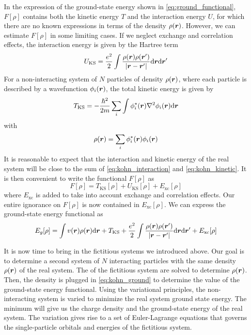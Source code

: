 In the expression of the ground-state energy shown in \cref{eq:ground_functional}, $F[\rho]$ contains both the kinetic energy $T$ and the interaction energy $U$, for which there are no known expressions in terms of the density $\rho(\mathbf{\boldsymbol{r}})$. However, we can estimate $F[\rho]$ in some limiting cases. If we neglect exchange and correlation effects, the interaction energy is given by the Hartree term
\begin{equation} \label{eq:kohn_interaction}
    U_\text{KS} = \frac{e^2}{2} \int \frac{\rho(\vec{r})\rho(\vec{r}')}{|\vec{r}-\vec{r}'|}  \dr \dr'
\end{equation}
For a non-interacting system of $N$ particles of density $\rho(\mathbf{\boldsymbol{r}})$, where each particle is described by a wavefunction $\phi_i(\mathbf{\boldsymbol{r}})$, the total kinetic energy is given by
\begin{equation} \label{eq:kohn_kinetic}
    T_\text{KS} = -\frac{\hslash^2}{2m}\sum_i \int \rr{\phi_i^*} \laplacian \rr{\phi_i} \dr
\end{equation}
with
\begin{equation}
    \rho(\mathbf{\boldsymbol{r}}) = \sum_i \phi_i^*(\mathbf{\boldsymbol{r}})\phi_i(\mathbf{\boldsymbol{r}})
\end{equation}
It is reasonable to expect that the interaction and kinetic energy of the real system will be close to the sum of \cref{eq:kohn_interaction} and \cref{eq:kohn_kinetic}. It is then convenient to write the functional $F[\rho]$ as
\begin{equation}
    F[\rho] = T_\text{KS}[\rho] + U_\text{KS}[\rho] + E_\text{xc}[\rho]
\end{equation}
where $E_\text{xc}$ is added to take into account exchange and correlation effects. Our entire ignorance on $F[\rho]$ is now contained in $E_\text{xc}[\rho]$.  We can express the ground-state energy functional as
\begin{equation} \label{eq:kohn_ground}
    E_g[\rho] = \int \rr{v} \rr{\rho} \dr +  T_\text{KS} + \frac{e^2}{2} \int \frac{\rho(\vec{r})\rho(\vec{r}')}{|\vec{r}-\vec{r}'|}  \dr \dr' + E_\text{xc}[\rho]
\end{equation}

It is now time to bring in the fictitious systems we introduced above. Our goal is to determine a second system of $N$ interacting particles with the same density $\rho(\mathbf{\boldsymbol{r}})$ of the real system. The \sche of the fictitious system are solved to determine $\rho(\mathbf{\boldsymbol{r}})$. Then, the density is plugged in \cref{eq:kohn_ground} to determine the value of the ground-state energy functional. Using the variational principles, the non-interacting system is varied to minimize the real system ground state energy. The minimum will give us the charge density and the ground-state energy of the real system. The variation gives rise to a set of Euler-Lagrange equations that governs the single-particle orbitals and energies of the fictitious system.

